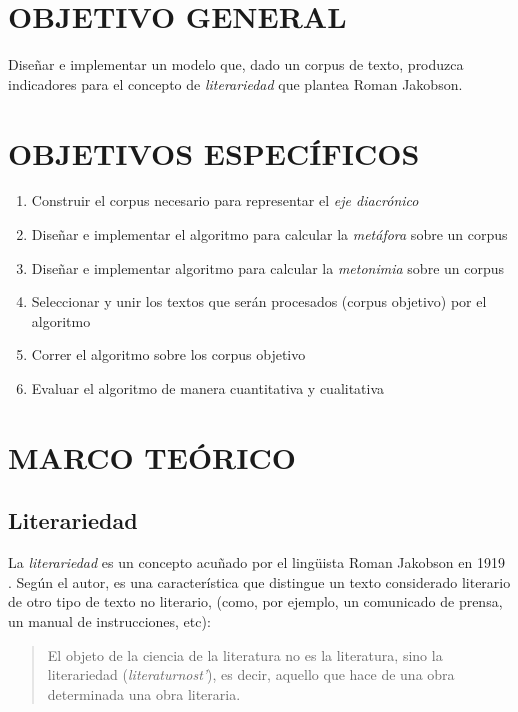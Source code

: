 \documentclass[12pt,letterpaper,twoside]{article}
\begin{document}
\section{OBJETIVO GENERAL}
\label{sec:org4dd0838}
Diseñar e implementar un modelo que, dado un corpus de texto, produzca
indicadores para el concepto de \emph{literariedad} que plantea Roman Jakobson.

\section{OBJETIVOS ESPECÍFICOS}
\label{sec:orgc56ffd9}

\begin{enumerate}
\item Construir el corpus necesario para representar el \emph{eje diacrónico}
\item Diseñar e implementar el algoritmo para calcular la \emph{metáfora} sobre un corpus
\item Diseñar e implementar algoritmo para calcular la \emph{metonimia} sobre un corpus
\item Seleccionar y unir los textos que serán procesados (corpus objetivo) por el algoritmo
\item Correr el algoritmo sobre los corpus objetivo
\item Evaluar el algoritmo de manera cuantitativa y cualitativa
\end{enumerate}

\section{MARCO TEÓRICO}
\label{sec:org59b2d32}

\subsection{Literariedad}
\label{sec:orga5d0a3b}



La \emph{literariedad} es un concepto acuñado por el lingüista Roman
Jakobson en 1919 \cite{jakobson1981linguistica}. Según el autor, es
una característica que distingue un texto considerado literario de
otro tipo de texto no literario, (como, por ejemplo, un comunicado
de prensa, un manual de instrucciones, etc):


\begin{quote}
El objeto de la ciencia de la literatura no es la literatura, sino
la literariedad (\emph{literaturnost'}), es decir, aquello que hace
de una obra determinada una obra
literaria. \cite[pg. 37]{eijembaum2010teoria}
\end{quote}
\end{document}
